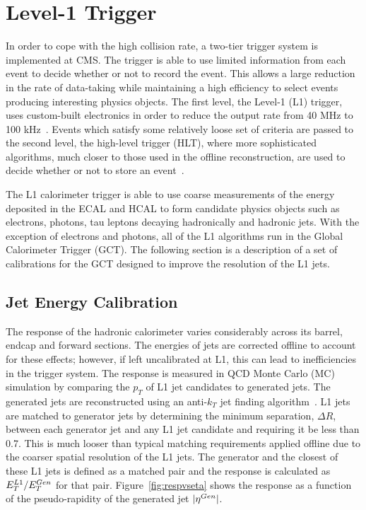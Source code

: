 \section{Level-1 Trigger}
\label{sec:l1trigger}

In order to cope with the high collision rate, a two-tier trigger
system is implemented at CMS. The trigger is able to use 
limited information from each event to decide whether or not
to record the event. This allows a large reduction in the rate
of data-taking while maintaining a high efficiency to select events
producing interesting physics objects.
The first level, the Level-1 (L1) trigger, uses custom-built 
electronics in order to reduce the output rate from 40 MHz to 100 kHz~\citep{l1}.
Events which satisfy some relatively loose set of criteria are passed to 
the second level, the high-level trigger (HLT), where more sophisticated
algorithms, much closer to those used in the offline reconstruction,
are used to decide whether or not to store an event~\citep{hlt}.

The L1 calorimeter trigger is able to
use coarse measurements of the energy deposited in the ECAL and HCAL
to form candidate physics objects such as electrons, photons, tau leptons
decaying hadronically and hadronic jets. With the exception of 
electrons and photons, all of the L1 algorithms run in the Global Calorimeter
Trigger (GCT).  The following section is a description of 
a set of calibrations for the GCT designed to improve the resolution of 
the L1 jets.  

\subsection{Jet Energy Calibration}
\label{sec:jetenergyresponse}
The response of the hadronic calorimeter varies
considerably across its barrel, endcap and forward sections. 
The energies of jets are corrected offline to account for these effects;
however, if left uncalibrated at L1, this can lead to inefficiencies in the 
trigger system. The response is measured in QCD Monte Carlo (MC)
simulation by comparing the $p_{T}$ of L1 jet candidates to generated
jets. The generated jets are reconstructed using an anti-$k_{T}$ jet finding algorithm~\citep{antikt}. 
L1 jets are matched
to generator jets by determining the minimum separation, $\Delta R$, between 
each generator jet and any L1 jet candidate and requiring it be less than 0.7.
This is much looser than typical matching requirements applied offline due to the coarser
spatial resolution of the L1 jets.
The generator and the closest of these L1 jets is defined as a matched pair
and the response is calculated as $E_{T}^{L1}/E_{T}^{Gen}$ for that pair.
Figure~\ref{fig:respvseta} shows the response as a function of the pseudo-rapidity of the
generated jet $|\eta^{Gen}|$.

